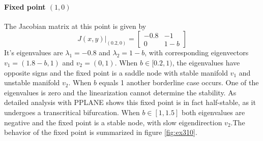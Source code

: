 \paragraph{Fixed point $(1,0)$}\hfill\newline
The Jacobian matrix at this point is given by 
\begin{equation}
J(x,y)|_{(0.2,0)}=\begin{bmatrix}
-0.8 & -1 \\
0 & 1-b
\end{bmatrix}
\end{equation}
It's eigenvalues are $\lambda_1=-0.8$ and $\lambda_2=1-b$, with corresponding eigenvectors $v_1=(1.8-b,1)$ and $v_2=(0,1)$. When $b \in [0.2,1)$, the eigenvalues have opposite signs and the fixed point is a saddle node with stable manifold $v_1$ and unstable manifold $v_2$. When $b$ equals 1 another borderline case occurs. One of the eigenvalues is zero and the linearization cannot determine the stability.  As detailed analysis with PPLANE shows this fixed point is in fact half-stable, as it undergoes a transcritical bifurcation. When $b \in [1,1.5]$ both eigenvalues are negative and the fixed point is a stable node, with slow eigendirection $v_2$.The behavior of the fixed point is summarized in figure \ref{fig:ex310}.
